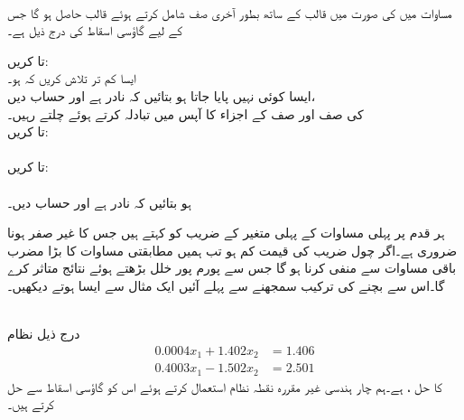 \noindent\makebox[\linewidth]{\rule{\textwidth}{0.4pt}}
\\
مساوات  میں  کی صورت میں  قالب  کے ساتھ بطور آخری صف  شامل کرتے ہوئے  قالب  حاصل ہو گا جس کے لیے گاؤسی اسقاط کی  درج ذیل ہے۔

 تا    کریں:\\
ایسا کم تر  تلاش کریں کہ  ہو۔\\
 ایسا کوئی  نہیں پایا جاتا ہو  بتائیں کہ  نادر ہے اور حساب  دیں،\\
  کی  صف  اور صف  کے اجزاء کا آپس میں تبادلہ  کرتے ہوئے چلتے رہیں۔\\
 تا   کریں:\\
\\
 تا   کریں:\\
\\
  ہو  بتائیں کہ  نادر ہے اور حساب  دیں۔\\
\noindent\makebox[\linewidth]{\rule{\textwidth}{0.4pt}}

ہر قدم پر پہلی مساوات کے پہلی متغیر کے  ضریب  کو  کہتے ہیں جس کا غیر صفر ہونا ضروری ہے۔اگر چول  ضریب  کی قیمت کم ہو تب ہمیں مطابقتی مساوات کا بڑا مضرب باقی مساوات سے منفی کرنا ہو گا جس سے  پورم پور خلل بڑھتے ہوئے  نتائج متاثر کرے گا۔اس سے بچنے کی ترکیب سمجھنے سے پہلے آئیں ایک مثال سے ایسا ہوتے دیکھیں۔

\quad {}\\
درج ذیل نظام 
\begin{align*}
0.0004x_1+1.402x_2&=1.406\\
0.4003x_1-1.502x_2&=2.501
\end{align*}
کا حل ،  ہے۔ہم چار ہندسی غیر مقررہ نقطہ نظام استعمال کرتے ہوئے اس کو گاؤسی اسقاط سے حل کرتے ہیں۔

